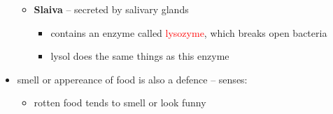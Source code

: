 \documentclass{article}
\theoremstyle{definition}
\begin{document}
\begin{itemize}
\begin{itemize}
			\item \textbf{Slaiva}  -- secreted by salivary glands
				\begin{itemize}
					\item   contains an enzyme called \textcolor{red}{lysozyme}, which breaks open bacteria
					\item lysol does the same things as this enzyme
				\end{itemize}
		\end{itemize}
	\item smell or appereance of food is also a defence -- senses:
		\begin{itemize}
			\item rotten food tends to smell or look funny
		\end{itemize}
\end{itemize}
\end{document}
